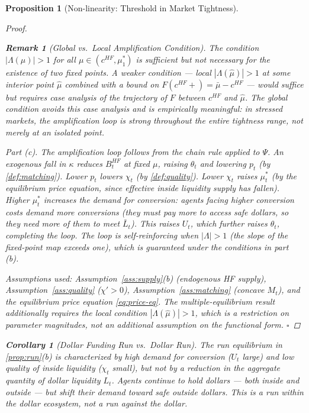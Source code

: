 \documentclass[12pt]{article}
\newtheorem{proposition}{Proposition}
\newtheorem{corollary}{Corollary}[proposition]
\newtheorem{remark}{Remark}
\theoremstyle{definition}
\newcommand{\1}[1]{\mathds{1}\left[#1\right]}
\begin{document}
\begin{proposition}[Non-linearity: Threshold in Market Tightness]
\begin{proof}
  \begin{remark}[Global vs.\ Local Amplification Condition]
    \label{rem:global-lambda}
    The condition $|\Lambda(\mu)| > 1$ for all $\mu \in (c^{HF}, \mu_1^*)$ is
    sufficient but not necessary for the existence of two fixed points. A weaker
    condition --- local $|\Lambda(\hat\mu)| > 1$ at some interior point $\hat\mu$
    combined with a bound on $F(c^{HF}+) = \bar\mu - c^{HF}$ --- would suffice
    but requires case analysis of the trajectory of $F$ between $c^{HF}$ and
    $\hat\mu$. The global condition avoids this case analysis and is empirically
    meaningful: in stressed markets, the amplification loop is strong throughout
    the entire tightness range, not merely at an isolated point.
  \end{remark}

  \textit{Part (c).} The amplification loop follows from the chain rule applied
  to $\Psi$. An exogenous fall in $\kappa$ reduces $B_t^{HF}$ at fixed $\mu$,
  raising $\theta_t$ and lowering $p_t$ (by \cref{def:matching}). Lower $p_t$
  lowers $\chi_t$ (by \cref{def:quality}). Lower $\chi_t$ raises $\mu_t^*$
  (by the equilibrium price equation, since effective inside liquidity supply
  has fallen). Higher $\mu_t^*$ increases the demand for conversion: agents
  facing higher conversion costs demand more conversions (they must pay more to
  access safe dollars, so they need more of them to meet $\bar{L}_t$). This
  raises $U_t$, which further raises $\theta_t$, completing the loop. The loop
  is self-reinforcing when $|\Lambda| > 1$ (the slope of the fixed-point map
  exceeds one), which is guaranteed under the conditions in part (b).

  \textit{Assumptions used:} Assumption~\ref{ass:supply}(b) (endogenous HF
  supply), Assumption~\ref{ass:quality} ($\chi' > 0$),
  Assumption~\ref{ass:matching} (concave $M_t$), and the equilibrium price
  equation \eqref{eq:price-eq}. The multiple-equilibrium result additionally
  requires the local condition $|\Lambda(\hat\mu)| > 1$, which is a restriction
  on parameter magnitudes, not an additional assumption on the functional form.
  \hfill$\square$
\end{proof}

\begin{corollary}[Dollar Funding Run vs.\ Dollar Run]
  \label{cor:run-type}
  The run equilibrium in \cref{prop:run}(b) is characterized by high demand
  for conversion ($U_t$ large) and low quality of inside liquidity ($\chi_t$
  small), but not by a reduction in the aggregate quantity of dollar liquidity
  $L_t$. Agents continue to hold dollars --- both inside and outside --- but
  shift their demand toward safe outside dollars. This is a run \emph{within}
  the dollar ecosystem, not a run \emph{against} the dollar.
\end{corollary}


\end{proposition}
\end{document}
